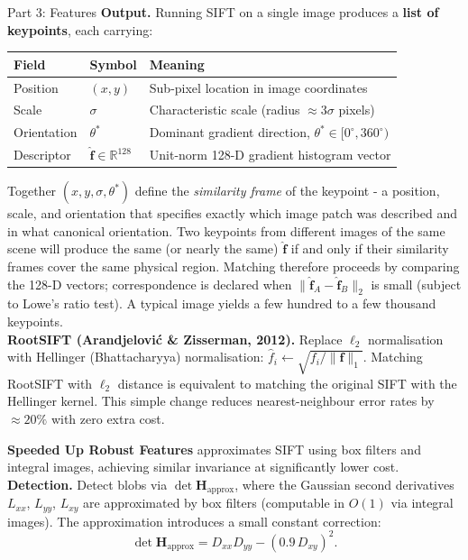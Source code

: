 \documentclass[letterpaper]{article}
\begin{document}
\begin{notes}{Part 3: Features}
\textbf{Output.} Running SIFT on a single image produces a \textbf{list of keypoints}, each carrying:
\begin{center}
\begin{tabular}{@{}lll@{}}
\toprule
Field & Symbol & Meaning \\
\midrule
Position      & $(x, y)$        & Sub-pixel location in image coordinates \\
Scale         & $\sigma$        & Characteristic scale (radius $\approx 3\sigma$ pixels) \\
Orientation   & $\theta^*$      & Dominant gradient direction, $\theta^* \in [0^\circ, 360^\circ)$ \\
Descriptor    & $\hat{\mathbf{f}} \in \mathbb{R}^{128}$ & Unit-norm 128-D gradient histogram vector \\
\bottomrule
\end{tabular}
\end{center}
Together $(x, y, \sigma, \theta^*)$ define the \emph{similarity frame} of the keypoint - a position, scale, and orientation that specifies exactly which image patch was described and in what canonical orientation. Two keypoints from different images of the same scene will produce the same (or nearly the same) $\hat{\mathbf{f}}$ if and only if their similarity frames cover the same physical region. Matching therefore proceeds by comparing the 128-D vectors; correspondence is declared when $\|\hat{\mathbf{f}}_A - \hat{\mathbf{f}}_B\|_2$ is small (subject to Lowe's ratio test). A typical image yields a few hundred to a few thousand keypoints.\\

\textbf{RootSIFT (Arandjelović \& Zisserman, 2012).} Replace $\ell_2$ normalisation with Hellinger (Bhattacharyya) normalisation: $\hat{f}_i \leftarrow \sqrt{f_i / \|\mathbf{f}\|_1}$. Matching RootSIFT with $\ell_2$ distance is equivalent to matching the original SIFT with the Hellinger kernel. This simple change reduces nearest-neighbour error rates by $\approx20\%$ with zero extra cost.








\textbf{Speeded Up Robust Features} approximates SIFT using box filters and integral images, achieving similar invariance at significantly lower cost.\\

\textbf{Detection.} Detect blobs via $\det\mathbf{H}_{\mathrm{approx}}$, where the Gaussian second derivatives $L_{xx}$, $L_{yy}$, $L_{xy}$ are approximated by box filters (computable in $O(1)$ via integral images). The approximation introduces a small constant correction:
$$\det\mathbf{H}_{\mathrm{approx}} = D_{xx}D_{yy} - (0.9\,D_{xy})^2.$$


\end{notes}
\end{document}
